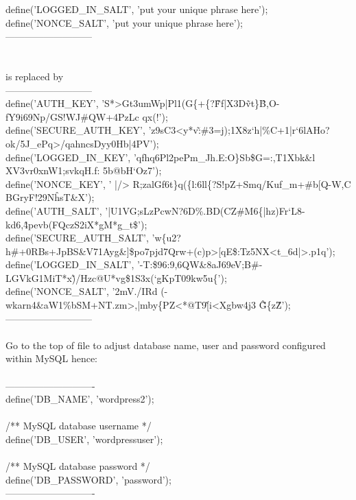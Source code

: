 \documentclass[10pt,a4paper]{article}
\begin{document}
{{{{{{{{{{{{{{{{{{{{define('LOGGED\_IN\_SALT',   'put your unique phrase here');\\
define('NONCE\_SALT',       'put your unique phrase here');\\
---------------------------\\
\\
\\
is replaced by\\
---------------------------\\
define('AUTH\_KEY',         'S*>Gt3umWp|Pl1(G\{+\{?\~Ff|X3D\~vt\}\^B,O-fY9i69Np/GS!WJ\#QW+4PzLc qx(!');\\
define('SECURE\_AUTH\_KEY',  'z9sC3<y*v\~:\#3=j);1X8z`h|\%C+1|r`6lAHo?ok/5J\_ePq>/qahncsDyy0Hb|4PV');\\
define('LOGGED\_IN\_KEY',    'qfhq6Pl2pePm\_Jh.E:O\}Sb\$G=:,T1Xbk\&l XV3vr0xnW1;svkqH.f: 5b@bH`Oz7');\\
define('NONCE\_KEY',        ' |/> R;zalGf6t\}q(\{l:6ll\{?S!pZ+Smq/Kuf\_m+\#b[Q-W,C BGryF!29N\^hsT\&X');\\
define('AUTH\_SALT',        '|U1VG;sLzPcwN?6D\%.BD(CZ\#M6\{|hz)Fr`L8-kd6,\^4pevb(FQczS2iX*gM*g\_t\$');\\
define('SECURE\_AUTH\_SALT', 'w\{u2?h\#+0RBs+JpBS\&V71Ayg\&]\$po7pjd7Qrw+(c)p>[qE\$:Tz5NX<t\_6d|>.p1q');\\
define('LOGGED\_IN\_SALT',   '-T:\$96:9,6QW\&8aJ69eV;B\#-LGVkG1MiT*x\~)/Hzc@U*vg\$1S3x(`gKpT09kw5u\{');\\
define('NONCE\_SALT',       '2mV./IRd (-wkarn4\&aW1\%bSM+NT.zm>,|mby\{PZ<*@T9\~[i<Xgbw4j3 \~\^G\{z\^Z');\\
---------------------------\\
\\
Go to the top of file to adjust database name, user and password configured within MySQL hence:\\
\\
----------------------------\\
define('DB\_NAME', 'wordpress2');\\
\\
/** MySQL database username */\\
define('DB\_USER', 'wordpressuser');\\
\\
/** MySQL database password */\\
define('DB\_PASSWORD', 'password');\\
----------------------------\\
\\
\\
}}}}}}}}}}}}}}}}}}}}
\end{document}
